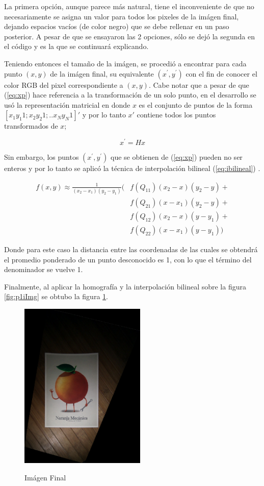 \documentclass{IEEEtran}
\begin{document}
La primera opción, aunque parece más natural, tiene el inconveniente
de que no necesariamente se asigna un valor para todos los pixeles de
la imágen final, dejando espacios vacíos (de color negro) que se debe
rellenar en un paso posterior. 
A pesar de que se ensayaron las 2 opciones, sólo se dejó la segunda
en el código y es la que se continuará explicando.

Teniendo entonces el tamaño de la imágen, se procedió a 
encontrar para cada punto $(x,y)$ de la imágen
final, su equivalente $(x^{'},y^{'})$  con el fin de conocer 
el color RGB del pixel correspondiente a $(x,y)$. Cabe notar
que a pesar de que (\ref{eq:xp}) hace referencia a la transformación 
de un solo punto, en el desarrollo se usó la representación matricial
en donde $x$ es el conjunto de puntos de la forma 
$[x_1 y_1 1; x_2 y_2 1; .. x_N y_N 1]'$ y por lo tanto $x'$ contiene
todos los puntos transformados de $x$;


\begin{equation}
x^{'}=H x
\label{eq:xp}
\end{equation} 

Sin embargo, los puntos $(x^{'},y^{'})$ que se obtienen de 
(\ref{eq:xp}) pueden no ser enteros y por lo tanto
se aplicó la técnica de interpolación bilineal (\ref{eq:ibilineal})
\cite{BilinearWiki}.

\begin{align}
f(x,y) \approx \frac{1}{(x_2 - x_1)(y_2 - y_1)}(
&f(Q_{11})(x_2-x)(y_2-y)+\nonumber\\
&f(Q_{21})(x-x_1)(y_2-y)+\nonumber\\
&f(Q_{12})(x_2-x)(y-y_1)+\nonumber\\
&f(Q_{22})(x-x_1)(y-y_1))
\label{eq:ibilineal}
\end{align} 

Donde para este caso la distancia entre las coordenadas de las cuales se
obtendrá el promedio ponderado de un punto desconocido es 1, con lo que 
el término del denominador se vuelve 1.

Finalmente, al aplicar la homografía y la interpolación bilineal sobre
la figura \ref{fig:p1iImg} se obtubo la figura \ref{fig:p1fImg}.

\begin{figure}%
\caption{Imágen Final}
\centering
\includegraphics[width=6cm,natwidth=486,natheight=648]{imgs/p1fImg.png}
\label{fig:p1fImg}
\end{figure} 
\end{document}
